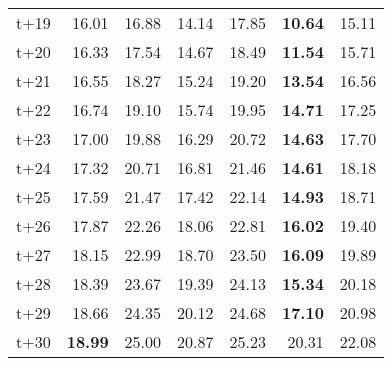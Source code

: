 \begin{table}[H]
\begin{tabular}{lrrrrrr}
t+19  & 16.01  & 16.88  & 14.14  & 17.85  & \textbf{10.64}  & 15.11  \\
t+20  & 16.33  & 17.54  & 14.67  & 18.49  & \textbf{11.54}  & 15.71  \\
t+21  & 16.55  & 18.27  & 15.24  & 19.20  & \textbf{13.54}  & 16.56  \\
t+22  & 16.74  & 19.10  & 15.74  & 19.95  & \textbf{14.71}  & 17.25  \\
t+23  & 17.00  & 19.88  & 16.29  & 20.72  & \textbf{14.63}  & 17.70  \\
t+24  & 17.32  & 20.71  & 16.81  & 21.46  & \textbf{14.61}  & 18.18  \\
t+25  & 17.59  & 21.47  & 17.42  & 22.14  & \textbf{14.93}  & 18.71  \\
t+26  & 17.87  & 22.26  & 18.06  & 22.81  & \textbf{16.02}  & 19.40  \\
t+27  & 18.15  & 22.99  & 18.70  & 23.50  & \textbf{16.09}  & 19.89  \\
t+28  & 18.39  & 23.67  & 19.39  & 24.13  & \textbf{15.34}  & 20.18  \\
t+29  & 18.66  & 24.35  & 20.12  & 24.68  & \textbf{17.10}  & 20.98  \\
t+30  & \textbf{18.99}  & 25.00  & 20.87  & 25.23  & 20.31  & 22.08  \\

\bottomrule
\end{tabular}
\end{table}
